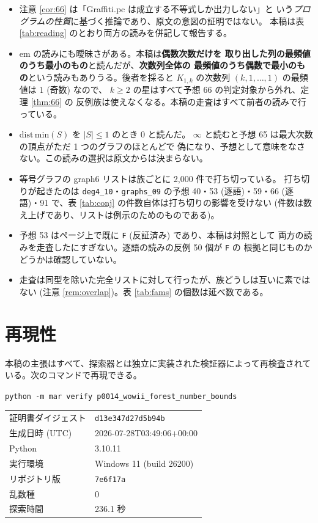 \documentclass[paper=a4,fontsize=10.5pt,jafontsize=10.5pt]{jlreq}
\theoremstyle{plain}
\theoremstyle{definition}
\begin{document}
\begin{itemize}
\item 注意 \ref{cor:66} は「Graffiti.pc は成立する不等式しか出力しない」と
  いう\emph{プログラムの性質}に基づく推論であり、原文の意図の証明ではない。
  本稿は表 \ref{tab:reading} のとおり両方の読みを併記して報告する。
\item $\mathrm{em}$ の読みにも曖昧さがある。本稿は\textbf{偶数次数だけを
  取り出した列の最頻値のうち最小のもの}と読んだが、\textbf{次数列全体の
  最頻値のうち偶数で最小のもの}という読みもありうる。後者を採ると
  $K_{1,k}$ の次数列 $(k, 1, \dots, 1)$ の最頻値は $1$ (奇数) なので、
  $k \ge 2$ の星はすべて予想 66 の判定対象から外れ、定理 \ref{thm:66} の
  反例族は使えなくなる。本稿の走査はすべて前者の読みで行っている。
\item $\mathrm{dist\,min}(S)$ を $|S| \le 1$ のとき $0$ と読んだ。
  $\infty$ と読むと予想 65 は最大次数の頂点がただ 1 つのグラフのほとんどで
  偽になり、予想として意味をなさない。この読みの選択は原文からは決まらない。
\item 等号グラフの graph6 リストは族ごとに 2,000 件で打ち切っている。
  打ち切りが起きたのは \texttt{deg4\_10}・\texttt{graphs\_09} の予想 40・53 (逐語)・59・66 (逐語)・91 で、表 \ref{tab:conj} の件数自体は打ち切りの影響を受けない (件数は数え上げであり、リストは例示のためのものである)。
\item 予想 53 はページ上で既に \texttt{F} (反証済み) であり、本稿は対照として
  両方の読みを走査したにすぎない。逐語の読みの反例 50 個が \texttt{F} の
  根拠と同じものかどうかは確認していない。
\item 走査は同型を除いた完全リストに対して行ったが、族どうしは互いに素では
  ない (注意 \ref{rem:overlap})。表 \ref{tab:fams} の個数は延べ数である。
\end{itemize}


\section*{再現性}
本稿の主張はすべて、探索器とは独立に実装された検証器によって再検査されている。次のコマンドで再現できる。

\begin{center}\texttt{python -m mar verify p0014\_wowii\_forest\_number\_bounds}\end{center}

\begin{center}\begin{tabular}{ll}\toprule
証明書ダイジェスト & \texttt{d13e347d27d5b94b} \\
生成日時 (UTC) & 2026-07-28T03:49:06+00:00 \\
Python & 3.10.11 \\
実行環境 & Windows 11 (build 26200) \\
リポジトリ版 & \texttt{7e6f17a} \\
乱数種 & 0 \\
探索時間 & 236.1 秒 \\
\bottomrule\end{tabular}\end{center}
\end{document}
